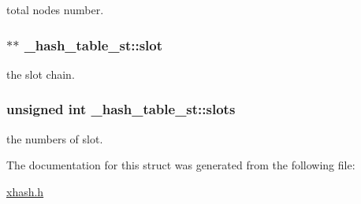 total nodes number. \hypertarget{struct__hash__table__st_a51f98610ce851ad0e56d06b21531155f}{
\subsubsection[{slot}]{$\ast$$\ast$ \-\_\-hash\-\_\-table\-\_\-st\-::slot}}\label{struct__hash__table__st_a51f98610ce851ad0e56d06b21531155f}
the slot chain. \hypertarget{struct__hash__table__st_afbb7851b13839f24ad916e2a2114255f}{
\subsubsection[{slots}]{\setlength{\rightskip}{0pt plus 5cm}unsigned int \-\_\-hash\-\_\-table\-\_\-st\-::slots}}\label{struct__hash__table__st_afbb7851b13839f24ad916e2a2114255f}
the numbers of slot. 

The documentation for this struct was generated from the following file\-:\begin{DoxyCompactItemize}
\item 
\hyperlink{xhash_8h}{xhash.\-h}\end{DoxyCompactItemize}

